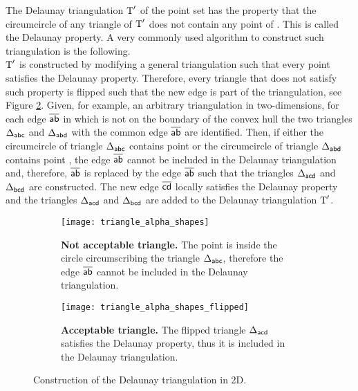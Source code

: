 The Delaunay triangulation $\mbox{$\textup{T}$}^{\prime}$ of the point set  has the property that the circumcircle of any triangle of $\mbox{$\textup{T}$}^{\prime}$ does not contain any point of . This is called the Delaunay property. A very commonly used algorithm to construct such triangulation is the following.\\ \indent 
$\mbox{$\textup{T}$}^\prime$ is constructed by modifying a general triangulation  such that every point satisfies the Delaunay property. 
Therefore, every triangle that does not satisfy such property is flipped such that the new edge is part of the triangulation, see Figure \ref{fig:Delaunay}. 
Given, for example, an arbitrary triangulation  in two-dimensions, for each edge $\overline{\textsf{ab}}$ in  which is not on the boundary of the convex hull the two triangles 
$\Delta_{\textsf{abc}}$ and $\Delta_{\textsf{abd}}$ with the common edge $\overline{\textsf{ab}}$ are identified. Then, if either the circumcircle of triangle $\Delta_{\textsf{abc}}$ contains point  or the circumcircle of triangle $\Delta_{\textsf{abd}}$ contains point , the edge $\overline{\textsf{ab}}$ cannot be included in the Delaunay triangulation and, therefore, $\overline{\textsf{ab}}$ is replaced by the edge $\overline{\textsf{ab}}$ such that the triangles $\Delta_{\textsf{acd}}$ and $\Delta_{\textsf{bcd}}$ are constructed. The new edge $\overline{\textsf{cd}}$ locally satisfies the Delaunay property and the triangles $\Delta_{\textsf{acd}}$ and  $\Delta_{\textsf{bcd}}$ are added to the Delaunay triangulation $\mbox{$\textup{T}$}^\prime$.  
\begin{figure}[t]\label{fig:Delaunay}
\begin{subfigure}[t]{0.48\textwidth}
\centering
\texttt{[image: triangle\_alpha\_shapes]}
\label{fig:shape}
\caption{\textbf{Not acceptable triangle.} The point  is inside the circle circumscribing the triangle $\Delta_{\textsf{abc}}$, therefore the edge $\overline{\textsf{ab}}$ cannot be included in the Delaunay triangulation.}
\end{subfigure}
\hfill
\begin{subfigure}[t]{0.48\textwidth}
\centering
\texttt{[image: triangle\_alpha\_shapes\_flipped]}
\caption{\textbf{Acceptable triangle.} The flipped triangle $\Delta_{\textsf{acd}}$ satisfies the Delaunay property, thus it is included in the Delaunay triangulation.}
\end{subfigure}
\caption{Construction of the Delaunay triangulation in 2D.}
\label{fig:Delaunay}
\end{figure}
